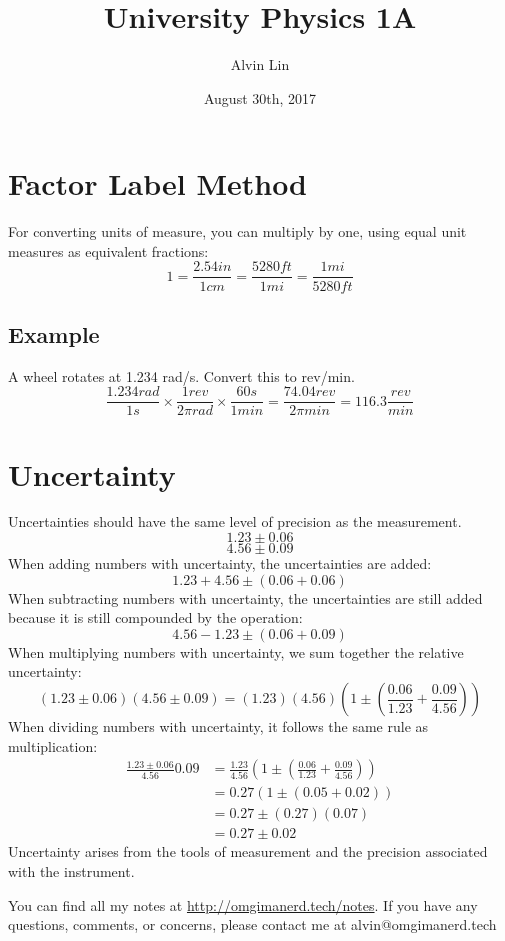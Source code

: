 \documentclass[letterpaper, 12pt]{math}
\title{University Physics 1A}
\author{Alvin Lin}
\date{August 30th, 2017}
\begin{document}
\maketitle

\section*{Factor Label Method}
For converting units of measure, you can multiply by one, using equal unit
measures as equivalent fractions:
\[ 1 = \frac{2.54in}{1cm} = \frac{5280ft}{1mi} = \frac{1mi}{5280ft} \]

\subsection*{Example}
A wheel rotates at 1.234 rad/s. Convert this to rev/min.
\[ \frac{1.234rad}{1s}\times\frac{1rev}{2\pi rad}\times\frac{60s}{1min} =
  \frac{74.04rev}{2\pi min} = 116.3\frac{rev}{min} \]

\section*{Uncertainty}
Uncertainties should have the same level of precision as the measurement.
\[ 1.23\pm0.06 \]
\[ 4.56\pm0.09 \]
When adding numbers with uncertainty, the uncertainties are added:
\[ 1.23+4.56\pm(0.06+0.06) \]
When subtracting numbers with uncertainty, the uncertainties are still
added because it is still compounded by the operation:
\[ 4.56-1.23\pm(0.06+0.09) \]
When multiplying numbers with uncertainty, we sum together the relative
uncertainty:
\[ (1.23\pm0.06)(4.56\pm0.09) =
  (1.23)(4.56)(1\pm(\frac{0.06}{1.23}+\frac{0.09}{4.56})) \]
When dividing numbers with uncertainty, it follows the same rule as
multiplication:
\begin{align*}
  \frac{1.23\pm0.06}{4.56}{0.09} &=
    \frac{1.23}{4.56}(1\pm(\frac{0.06}{1.23}+\frac{0.09}{4.56})) \\
  &= 0.27(1\pm(0.05+0.02)) \\
  &= 0.27\pm(0.27)(0.07) \\
  &= 0.27\pm0.02
\end{align*}
Uncertainty arises from the tools of measurement and the precision associated
with the instrument.

\begin{center}
  You can find all my notes at \url{http://omgimanerd.tech/notes}. If you have
  any questions, comments, or concerns, please contact me at
  alvin@omgimanerd.tech
\end{center}
\end{document}
